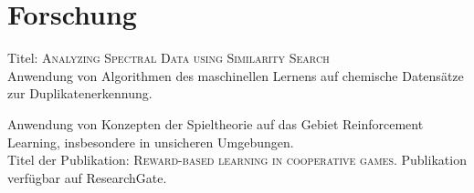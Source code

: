 \documentclass[]{deedy-resume-openfont}
\begin{document}
\begin{minipage}[t]{0.66\textwidth}

\section{Forschung}
\descript{}
Titel: \textsc{Analyzing Spectral Data using Similarity Search} \\
Anwendung von Algorithmen des maschinellen Lernens auf chemische Datensätze zur Duplikatenerkennung.
\sectionsep

\descript{}
Anwendung von Konzepten der Spieltheorie auf das Gebiet Reinforcement Learning, insbesondere in unsicheren Umgebungen. \\
Titel der Publikation: \textsc{Reward-based learning in cooperative games}. Publikation verfügbar auf ResearchGate.
\sectionsep

\end{minipage}
\end{document}
